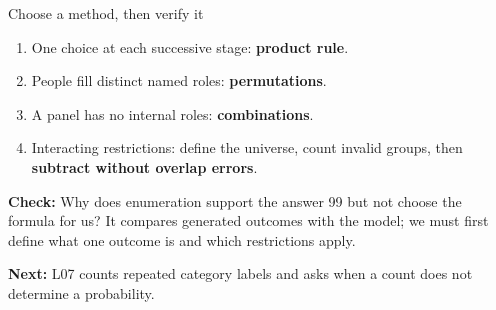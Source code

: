 \documentclass[aspectratio=169,10pt,english]{beamer}
\begin{document}
\begin{frame}{Choose a method, then verify it}
\small
\begin{enumerate}
\item One choice at each successive stage: \textbf{product rule}.
\item People fill distinct named roles: \textbf{permutations}.
\item A panel has no internal roles: \textbf{combinations}.
\item Interacting restrictions: define the universe, count invalid groups, then \textbf{subtract without overlap errors}.
\end{enumerate}
\par\medskip
\textbf{Check:} Why does enumeration support the answer 99 but not choose the formula for us? It compares generated outcomes with the model; we must first define what one outcome is and which restrictions apply.
\par\smallskip
\textbf{Next:} L07 counts repeated category labels and asks when a count does not determine a probability.
\end{frame}
\end{document}
